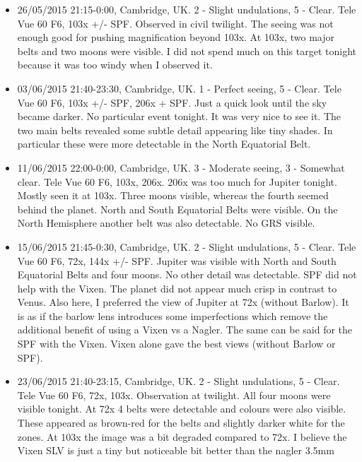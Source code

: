 \begin{itemize}
\item 26/05/2015 21:15-0:00, Cambridge, UK. 2 - Slight undulations, 5 - Clear. Tele Vue 60 F6, 103x +/- SPF. Observed in civil twilight. The seeing was not enough good for pushing magnification beyond 103x. At 103x, two major belts and two moons were visible. I did not spend much on this target tonight because it was too windy when I observed it.
\item 03/06/2015 21:40-23:30, Cambridge, UK. 1 - Perfect seeing, 5 - Clear. Tele Vue 60 F6, 103x +/- SPF, 206x + SPF. Just a quick look until the sky became darker. No particular event tonight. It was very nice to see it. The two main belts revealed some subtle detail appearing like tiny shades. In particular these were more detectable in the North Equatorial Belt.  
\item 11/06/2015 22:00-0:00, Cambridge, UK. 3 - Moderate seeing, 3 - Somewhat clear. Tele Vue 60 F6, 103x, 206x. 206x was too much for Jupiter tonight. Mostly seen it at 103x. Three moons visible, whereas the fourth seemed behind the planet. North and South Equatorial Belts were visible. On the North Hemisphere another belt was also detectable. No GRS visible.
\item 15/06/2015 21:45-0:30, Cambridge, UK. 2 - Slight undulations, 5 - Clear. Tele Vue 60 F6, 72x, 144x +/- SPF. Jupiter was visible with North and South Equatorial Belts and four moons. No other detail was detectable. SPF did not help with the Vixen. The planet did not appear much crisp in contrast to Venus. Also here, I preferred the view of Jupiter at 72x (without Barlow). It is as if the barlow lens introduces some imperfections which remove the additional benefit of using a Vixen vs a Nagler. The same can be said for the SPF with the Vixen. Vixen alone gave the best views (without Barlow or SPF).
\item 23/06/2015 21:40-23:15, Cambridge, UK. 2 - Slight undulations, 5 - Clear. Tele Vue 60 F6, 72x, 103x. Observation at twilight. All four moons were visible tonight. At 72x 4 belts were detectable and colours were also visible. These appeared as brown-red for the belts and slightly darker white for the zones. At 103x the image was a bit degraded compared to 72x. I believe the Vixen SLV is just a tiny but noticeable bit better than the nagler 3.5mm
\end{itemize}
